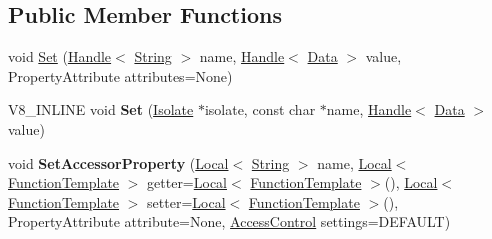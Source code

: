 \subsection*{Public Member Functions}
\begin{DoxyCompactItemize}
\item 
void \hyperlink{classv8_1_1Template_a8a29557db5d0bc980752084b925a9b01}{Set} (\hyperlink{classv8_1_1Handle}{Handle}$<$ \hyperlink{classv8_1_1String}{String} $>$ name, \hyperlink{classv8_1_1Handle}{Handle}$<$ \hyperlink{classv8_1_1Data}{Data} $>$ value, Property\-Attribute attributes=None)
\item 
\hypertarget{classv8_1_1Template_a92d31ee3f0dc22160bd0964c8aeaeb70}{V8\-\_\-\-I\-N\-L\-I\-N\-E void {\bfseries Set} (\hyperlink{classv8_1_1Isolate}{Isolate} $\ast$isolate, const char $\ast$name, \hyperlink{classv8_1_1Handle}{Handle}$<$ \hyperlink{classv8_1_1Data}{Data} $>$ value)}\label{classv8_1_1Template_a92d31ee3f0dc22160bd0964c8aeaeb70}

\item 
\hypertarget{classv8_1_1Template_a1806da8c927107645490f72780f7da8c}{void {\bfseries Set\-Accessor\-Property} (\hyperlink{classv8_1_1Local}{Local}$<$ \hyperlink{classv8_1_1String}{String} $>$ name, \hyperlink{classv8_1_1Local}{Local}$<$ \hyperlink{classv8_1_1FunctionTemplate}{Function\-Template} $>$ getter=\hyperlink{classv8_1_1Local}{Local}$<$ \hyperlink{classv8_1_1FunctionTemplate}{Function\-Template} $>$(), \hyperlink{classv8_1_1Local}{Local}$<$ \hyperlink{classv8_1_1FunctionTemplate}{Function\-Template} $>$ setter=\hyperlink{classv8_1_1Local}{Local}$<$ \hyperlink{classv8_1_1FunctionTemplate}{Function\-Template} $>$(), Property\-Attribute attribute=None, \hyperlink{namespacev8_a31d8355cb043d7d2dda3f4a52760b64e}{Access\-Control} settings=D\-E\-F\-A\-U\-L\-T)}\label{classv8_1_1Template_a1806da8c927107645490f72780f7da8c}


\end{DoxyCompactItemize}
